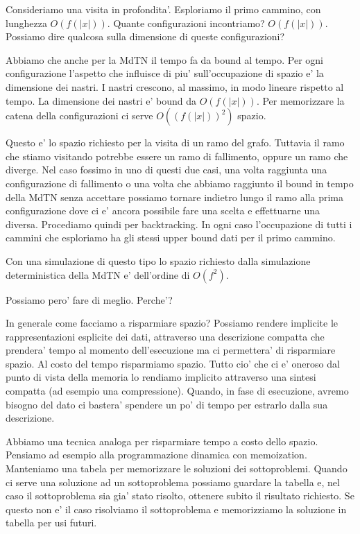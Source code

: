 Consideriamo una visita in profondita'. Esploriamo il primo cammino, con lunghezza $O(f(|x|))$.
Quante configurazioni incontriamo? $O(f(|x|))$. Possiamo dire qualcosa sulla dimensione di queste
configurazioni? 

Abbiamo che anche per la MdTN il tempo fa da bound al tempo. Per ogni configurazione l'aspetto che
influisce di piu' sull'occupazione di spazio e' la dimensione dei nastri. I nastri crescono, al
massimo, in modo lineare rispetto al tempo. La dimensione dei nastri e' bound da $O(f(|x|))$. Per
memorizzare la catena della configurazioni ci serve $O((f(|x|))^{2})$ spazio. 

Questo e' lo spazio richiesto per la visita di un ramo del grafo. Tuttavia il ramo che stiamo
visitando potrebbe essere un ramo di fallimento, oppure un ramo che diverge. Nel caso fossimo in uno
di questi due casi, una volta raggiunta una configurazione di fallimento o una volta che abbiamo
raggiunto il bound in tempo della MdTN senza accettare possiamo tornare indietro lungo il ramo alla
prima configurazione dove ci e' ancora possibile fare una scelta e effettuarne una diversa.
Procediamo quindi per backtracking. In ogni caso l'occupazione di tutti i cammini che esploriamo ha
gli stessi upper bound dati per il primo cammino.

Con una simulazione di questo tipo lo spazio richiesto dalla simulazione deterministica della MdTN
e' dell'ordine di $O(f^{2})$.

Possiamo pero' fare di meglio. Perche'?

In generale come facciamo a risparmiare spazio? Possiamo rendere implicite le rappresentazioni
esplicite dei dati, attraverso una descrizione compatta che prendera' tempo al momento
dell'esecuzione ma ci permettera' di risparmiare spazio. Al costo del tempo risparmiamo spazio.
Tutto cio' che ci e' oneroso dal punto di vista della memoria lo rendiamo implicito attraverso una
sintesi compatta (ad esempio una compressione). Quando, in fase di esecuzione, avremo bisogno del
dato ci bastera' spendere un po' di tempo per estrarlo dalla sua descrizione.

Abbiamo una tecnica analoga per risparmiare tempo a costo dello spazio. Pensiamo ad esempio alla
programmazione dinamica con memoization. Manteniamo una tabela per memorizzare le soluzioni dei
sottoproblemi. Quando ci serve una soluzione ad un sottoproblema possiamo guardare la tabella e, nel
caso il sottoproblema sia gia' stato risolto, ottenere subito il risultato richiesto. Se questo non
e' il caso risolviamo il sottoproblema e memorizziamo la soluzione in tabella per usi futuri.

